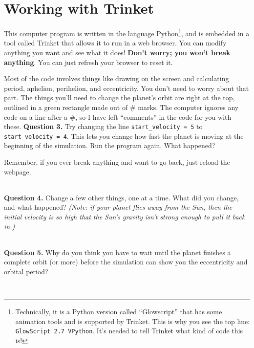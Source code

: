 \documentclass[11pt]{article}
\begin{document}
\section{Working with Trinket}

This computer program is written in the language Python\footnote{Technically, it is a Python version called ``Glowscript'' that has some animation tools and is supported
	by Trinket. This is why you see the top line: {\tt GlowScript 2.7 VPython}. It's needed to tell Trinket what kind of code this is!}, and is embedded in a tool called Trinket that allows it to run in a web browser. You can modify anything you want and see what it does! {\bf Don't worry; you won't break anything}. You can just refresh your browser to reset it.

Most of the code involves things like drawing on the screen and calculating period, aphelion, perihelion, and eccentricity. You don't need to worry about that part. The things you'll need to change the planet's orbit are right at the top, outlined in a green rectangle made out of \# marks. The computer ignores any code on a line after a \#, so I have left ``comments'' in the code for you with these.
\newpage
\textbf{Question 3.} Try changing the line {\tt start\_velocity   = 5} to {\tt start\_velocity   = 4}. This lets you change how fast the planet is moving at the beginning of the simulation. Run the program again. What happened?

Remember, if you ever break anything and want to go back, just reload the webpage.

\vspace*{1.5cm}
\hrulefill\\

\textbf{Question 4.} Change a few other things, one at a time. What did you change, and what happened? {\it (Note: if your planet flies away from the Sun, then the initial velocity is so high that the Sun's gravity isn't strong enough to pull it back in.)}

\vspace*{4cm}
\hrulefill\\

\textbf{Question 5.} Why do you think you have to wait until the planet finishes a complete orbit (or more) before the simulation can show you the eccentricity and orbital period?

\vspace*{2.5cm}
\hrulefill\\
\end{document}

